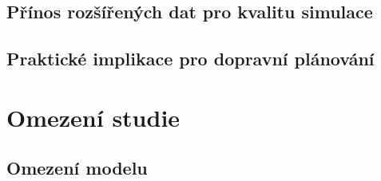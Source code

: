 \subsection{Přínos rozšířených dat pro kvalitu simulace}

\subsection{Praktické implikace pro dopravní plánování}


\section{Omezení studie}
\label{sec:omezeni}

\subsection{Omezení modelu}

